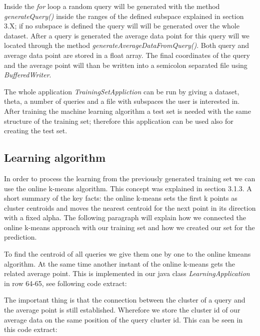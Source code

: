 \documentclass{lmproj}
\begin{document}
Inside the \textit{for} loop a random query will be generated with the method \textit{generateQuery()} inside the ranges of the defined subspace explained in section 3.X; if no subspace is defined the query will will be generated over the whole dataset. After a query is generated the average data point for this query will we located through the method \textit{generateAverageDataFromQuery()}. Both query and average data point are stored in a float array. The final coordinates of the query and the average point will than be written into a semicolon separated file using \textit{BufferedWriter}.

The whole application \textit{TrainingSetAppliction} can be run by giving a dataset, theta, a number of queries and a file with subspaces the user is interested in.
After training the machine learning algorithm a test set is needed with the same structure of the training set; therefore this application can be used also for creating the test set. 


\subsection{Learning algorithm}

In order to process the learning from the previously generated training set we can use the online k-means algorithm. This concept was explained in section 3.1.3.
A short summary of the key facts: the online k-means sets the first k points as cluster centroids and moves the nearest centroid for the next point in its direction with a fixed alpha. The following paragraph will explain how we connected the online k-means approach with our training set and how we created our set for the prediction.

To find the centroid of all queries we give them one by one to the online kmeans algorithm. At the same time another instant of the online k-means gets the related average point. This is implemented in our java class \textit{LearningApplication} in row 64-65, see following code extract:



The important thing is that the connection between the cluster of a query and the average point is still established. Wherefore we store the cluster id of our average data on the same position of the query cluster id. This can be seen in this code extract:

\end{document}
